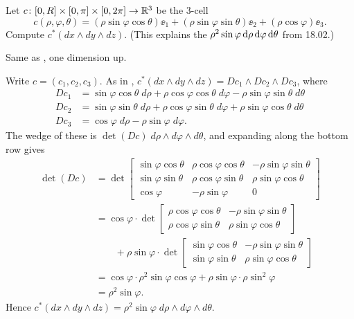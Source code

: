 \begin{problem}
	Let $c \colon [0,R] \times [0,\pi] \times [0,2\pi] \to \mathbb R^3$ be the $3$-cell
	\[ c(\rho, \varphi, \theta) = (\rho\sin\varphi\cos\theta)\ee_1
		+ (\rho\sin\varphi\sin\theta)\ee_2 + (\rho\cos\varphi)\ee_3. \]
	Compute $c^\ast(dx \wedge dy \wedge dz)$.
	(This explains the $\rho^2 \sin\varphi \odif \rho \odif \varphi \odif \theta$ from 18.02.)
	\begin{hint}
		Same as , one dimension up.
	\end{hint}
	\begin{sol}
		Write $c = (c_1, c_2, c_3)$.
		As in ,
		$c^\ast(dx \wedge dy \wedge dz) = Dc_1 \wedge Dc_2 \wedge Dc_3$, where
		\begin{align*}
			Dc_1 &= \sin\varphi\cos\theta \; d\rho + \rho\cos\varphi\cos\theta \; d\varphi
				- \rho\sin\varphi\sin\theta \; d\theta \\
			Dc_2 &= \sin\varphi\sin\theta \; d\rho + \rho\cos\varphi\sin\theta \; d\varphi
				+ \rho\sin\varphi\cos\theta \; d\theta \\
			Dc_3 &= \cos\varphi \; d\rho - \rho\sin\varphi \; d\varphi.
		\end{align*}
		The wedge of these is $\det(Dc) \; d\rho \wedge d\varphi \wedge d\theta$,
		and expanding along the bottom row gives
		\begin{align*}
			\det(Dc) &= \det \begin{bmatrix}
					\sin\varphi\cos\theta & \rho\cos\varphi\cos\theta & -\rho\sin\varphi\sin\theta \\
					\sin\varphi\sin\theta & \rho\cos\varphi\sin\theta & \rho\sin\varphi\cos\theta \\
					\cos\varphi & -\rho\sin\varphi & 0
				\end{bmatrix} \\
			&= \cos\varphi \cdot \det \begin{bmatrix}
					\rho\cos\varphi\cos\theta & -\rho\sin\varphi\sin\theta \\
					\rho\cos\varphi\sin\theta & \rho\sin\varphi\cos\theta
				\end{bmatrix} \\
			&\qquad + \rho\sin\varphi \cdot \det \begin{bmatrix}
					\sin\varphi\cos\theta & -\rho\sin\varphi\sin\theta \\
					\sin\varphi\sin\theta & \rho\sin\varphi\cos\theta
				\end{bmatrix} \\
			&= \cos\varphi \cdot \rho^2\sin\varphi\cos\varphi
				+ \rho\sin\varphi \cdot \rho\sin^2\varphi \\
			&= \rho^2\sin\varphi.
		\end{align*}
		Hence $c^\ast(dx \wedge dy \wedge dz) = \rho^2\sin\varphi \; d\rho \wedge d\varphi \wedge d\theta$.
	\end{sol}
\end{problem}
